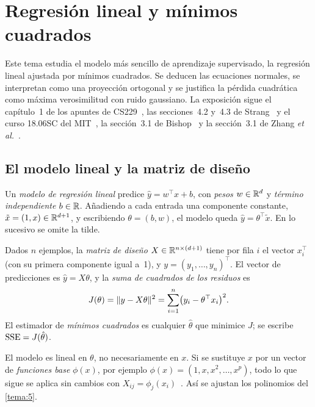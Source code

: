 \chapter{Regresión lineal y mínimos cuadrados}
\label{tema:2}

Este tema estudia el modelo más sencillo de aprendizaje supervisado, la regresión lineal ajustada por mínimos cuadrados. Se deducen las ecuaciones normales, se interpretan como una proyección ortogonal y se justifica la pérdida cuadrática como máxima verosimilitud con ruido gaussiano. La exposición sigue el capítulo~1 de los apuntes de CS229~\cite{cs229}, las secciones~4.2 y~4.3 de Strang~\cite{strang} y el curso 18.06SC del MIT~\cite{mit1806}, la sección~3.1 de Bishop~\cite{bishop} y la sección~3.1 de Zhang \emph{et al.}~\cite{d2l}.

\section{El modelo lineal y la matriz de diseño}

\begin{definicion}
Un \emph{modelo de regresión lineal} predice $\hat y=w^{\top}x+b$, con \emph{pesos} $w\in\mathbb{R}^{d}$ y \emph{término independiente} $b\in\mathbb{R}$. Añadiendo a cada entrada una componente constante, $\tilde x=(1,x)\in\mathbb{R}^{d+1}$, y escribiendo $\theta=(b,w)$, el modelo queda $\hat y=\theta^{\top}\tilde x$. En lo sucesivo se omite la tilde.
\end{definicion}

\begin{definicion}
Dados $n$ ejemplos, la \emph{matriz de diseño} $X\in\mathbb{R}^{n\times(d+1)}$ tiene por fila $i$ el vector $x_i^{\top}$ (con su primera componente igual a~1), y $y=(y_1,\dots,y_n)^{\top}$. El vector de predicciones es $\hat y=X\theta$, y la \emph{suma de cuadrados de los residuos} es
\[
J(\theta)=\lVert y-X\theta\rVert^{2}=\sum_{i=1}^{n}\bigl(y_i-\theta^{\top}x_i\bigr)^{2}.
\]
El estimador de \emph{mínimos cuadrados} es cualquier $\hat\theta$ que minimice $J$; se escribe $\operatorname{SSE}=J(\hat\theta)$.
\end{definicion}

\begin{observacion}
El modelo es lineal en $\theta$, no necesariamente en $x$. Si se sustituye $x$ por un vector de \emph{funciones base} $\phi(x)$, por ejemplo $\phi(x)=(1,x,x^{2},\dots,x^{p})$, todo lo que sigue se aplica sin cambios con $X_{ij}=\phi_j(x_i)$~\cite[§3.1]{bishop}. Así se ajustan los polinomios del \cref{tema:5}.
\end{observacion}

